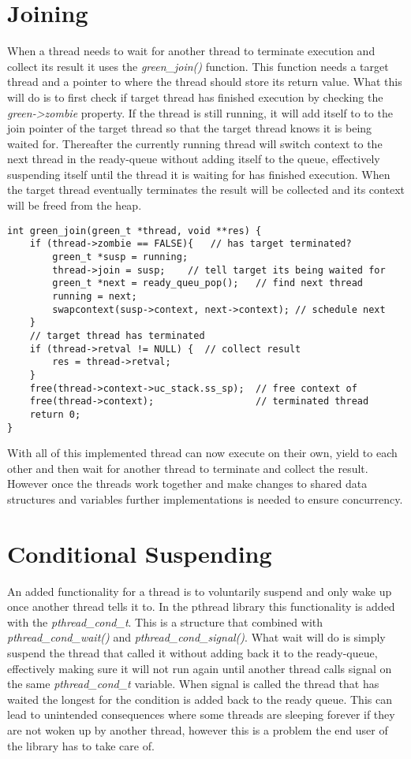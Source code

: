 \documentclass[a4paper,10pt]{article}
\begin{document}
\section*{Joining}
When a thread needs to wait for another thread to terminate execution and collect its result it uses the \emph{green\_join()} function. This function needs a target thread and a pointer to where the thread should store its return value. What this will do is to first check if target thread has finished execution by checking the \emph{green->zombie} property. If the thread is still running, it will add itself to to the join pointer of the target thread so that the target thread knows it is being waited for. Thereafter the currently running thread will switch context to the next thread in the ready-queue without adding itself to the queue, effectively suspending itself until the thread it is waiting for has finished execution. When the target thread eventually terminates the result will be collected and its context will be freed from the heap. 

\begin{lstlisting}[title=Thread Joining]
int green_join(green_t *thread, void **res) {
    if (thread->zombie == FALSE){   // has target terminated?
        green_t *susp = running;
        thread->join = susp;    // tell target its being waited for
        green_t *next = ready_queu_pop();   // find next thread
        running = next;
        swapcontext(susp->context, next->context); // schedule next
    }
    // target thread has terminated
    if (thread->retval != NULL) {  // collect result
        res = thread->retval;
    }
    free(thread->context->uc_stack.ss_sp);  // free context of 
    free(thread->context);                  // terminated thread
    return 0;
}
\end{lstlisting}
With all of this implemented thread can now execute on their own, yield to each other and then wait for another thread to terminate and collect the result. However once the threads work together and make changes to shared data structures and variables further implementations is needed to ensure concurrency.


\section*{Conditional Suspending}
An added functionality for a thread is to voluntarily suspend and only wake up once another thread tells it to. In the pthread library this functionality is added with the \emph{pthread\_cond\_t}. This is a structure that combined with \emph{pthread\_cond\_wait()} and \emph{pthread\_cond\_signal()}. What wait will do is simply suspend the thread that called it without adding back it to the ready-queue, effectively making sure it will not run again until another thread calls signal on the same \emph{pthread\_cond\_t} variable. When signal is called the thread that has waited the longest for the condition is added back to the ready queue. This can lead to unintended consequences where some threads are sleeping forever if they are not woken up by another thread, however this is a problem the end user of the library has to take care of.
\newpage
\end{document}
